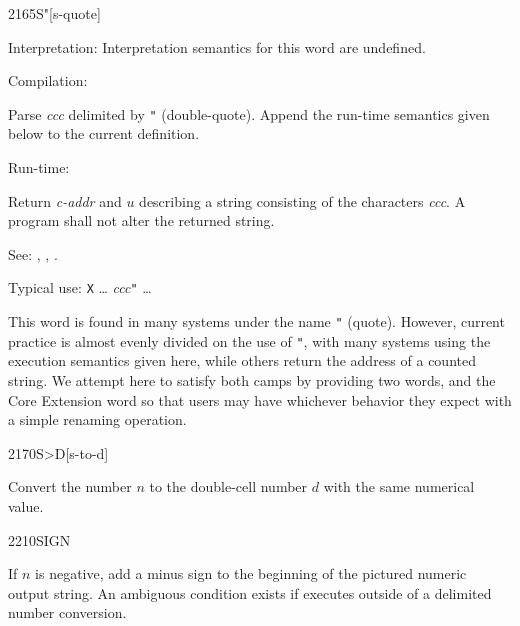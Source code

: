 \begin{newword*}[Sq]{2165}{S"}[s-quote]
\item[Interpretation:]
	Interpretation semantics for this word are undefined.

\item[Compilation:]

	Parse \emph{ccc} delimited by \texttt{"} (double-quote). Append
	the run-time semantics given below to the current definition.

\item[Run-time:]

	Return \emph{c-addr} and $u$ describing a string consisting of
	the characters \emph{ccc}. A program shall not alter the
	returned string.

\item[See:]
	,
	,
	.

	\begin{rationale} %
		Typical use:
			\word{:} \texttt{X} {\ldots}
				 \emph{ccc}\texttt{"}
			{\ldots} \word{;}

		This word is found in many systems under the name \texttt{"}
		(quote). However, current practice is almost evenly divided on
		the use of \texttt{"}, with many systems using the execution
		semantics given here, while others return the address of a
		counted string. We attempt here to satisfy both camps by
		providing two words,  and the Core Extension word
		 so that users may have whichever behavior they expect
		with a simple renaming operation.
	\end{rationale}
\end{newword*}


\begin{newword}[StoD]{2170}{S>D}[s-to-d]

	Convert the number $n$ to the double-cell number $d$ with the
	same numerical value.
\end{newword}


\begin{newword}{2210}{SIGN}

	If $n$ is negative, add a minus sign to the beginning of the
	pictured numeric output string. An ambiguous condition exists
	if  executes outside of a  
	delimited number conversion.
\end{newword}


